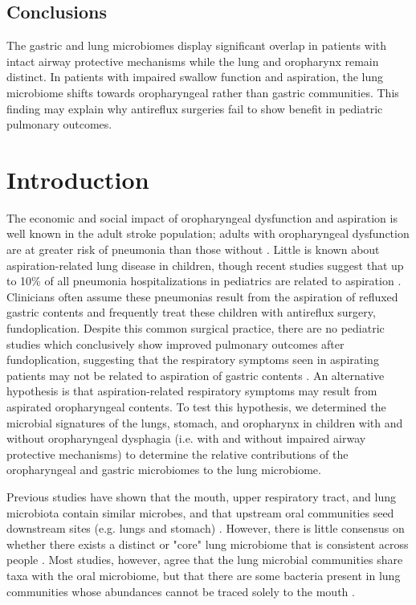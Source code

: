\subsection*{Conclusions}

The gastric and lung microbiomes display significant overlap in patients with intact airway protective mechanisms while the lung and oropharynx remain distinct.
In patients with impaired swallow function and aspiration, the lung microbiome shifts towards oropharyngeal rather than gastric communities.
This finding may explain why antireflux surgeries fail to show benefit in pediatric pulmonary outcomes.

\newpage
\section{Introduction}

The economic and social impact of oropharyngeal dysfunction and aspiration is well known in the adult stroke population; adults with oropharyngeal dysfunction are at greater risk of pneumonia than those without \cite{holas1994aspcomplications}.
Little is known about aspiration-related lung disease in children, though recent studies suggest that up to 10\% of all pneumonia hospitalizations in pediatrics are related to aspiration \cite{thomson2016asppneumo}.
Clinicians often assume these pneumonias result from the aspiration of refluxed gastric contents and frequently treat these children with antireflux surgery, fundoplication.
Despite this common surgical practice, there are no pediatric studies which conclusively show improved pulmonary outcomes after fundoplication, suggesting that the respiratory symptoms seen in aspirating patients may not be related to aspiration of gastric contents \cite{barnhart2013fundo,lee2008fundo,goldin2006fundo,yeh2016,srivastava2009fundo}.
An alternative hypothesis is that aspiration-related respiratory symptoms may result from aspirated oropharyngeal contents.
To test this hypothesis, we determined the microbial signatures of the lungs, stomach, and oropharynx in children with and without oropharyngeal dysphagia (i.e. with and without impaired airway protective mechanisms) to determine the relative contributions of the oropharyngeal and gastric microbiomes to the lung microbiome.

Previous studies have shown that the mouth, upper respiratory tract, and lung microbiota contain similar microbes, and that upstream oral communities seed downstream sites (e.g. lungs and stomach) \cite{Bassis2015source,Charlson2011topographical,rosen2015ppi}.
However, there is little consensus on whether there exists a distinct or "core" lung microbiome that is consistent across people \cite{Charlson2011topographical,venkataraman-2015-dispersal,segal-2013-pneumotypes,erbDownward-2011-COPD}.
Most studies, however, agree that the lung microbial communities share taxa with the oral microbiome, but that there are some bacteria present in lung communities whose abundances cannot be traced solely to the mouth \cite{Bassis2015source,Charlson2011topographical,morris-2013-healthsmokers,segal-2013-pneumotypes}.

